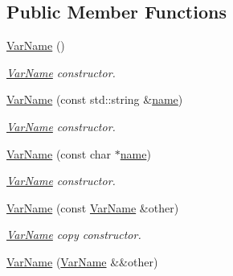 \subsection*{Public Member Functions}
\begin{DoxyCompactItemize}
\item 
\hyperlink{classcreek_1_1_var_name_a7f1b641288c66a55d78f77a0548edffe}{Var\+Name} ()\hypertarget{classcreek_1_1_var_name_a7f1b641288c66a55d78f77a0548edffe}{}\label{classcreek_1_1_var_name_a7f1b641288c66a55d78f77a0548edffe}

\begin{DoxyCompactList}\small\item\em {\ttfamily \hyperlink{classcreek_1_1_var_name}{Var\+Name}} constructor. \end{DoxyCompactList}\item 
\hyperlink{classcreek_1_1_var_name_ac462c46e6ca3a7a75395608bd7b120ad}{Var\+Name} (const std\+::string \&\hyperlink{classcreek_1_1_var_name_af508e16490f2cfbfdcb561f9c855fcf0}{name})
\begin{DoxyCompactList}\small\item\em {\ttfamily \hyperlink{classcreek_1_1_var_name}{Var\+Name}} constructor. \end{DoxyCompactList}\item 
\hyperlink{classcreek_1_1_var_name_a0bbb0e0c4420ef40fed4a637666db0ea}{Var\+Name} (const char $\ast$\hyperlink{classcreek_1_1_var_name_af508e16490f2cfbfdcb561f9c855fcf0}{name})
\begin{DoxyCompactList}\small\item\em {\ttfamily \hyperlink{classcreek_1_1_var_name}{Var\+Name}} constructor. \end{DoxyCompactList}\item 
\hyperlink{classcreek_1_1_var_name_a1f3691161bcf6e90a120b39c29c6c50c}{Var\+Name} (const \hyperlink{classcreek_1_1_var_name}{Var\+Name} \&other)\hypertarget{classcreek_1_1_var_name_a1f3691161bcf6e90a120b39c29c6c50c}{}\label{classcreek_1_1_var_name_a1f3691161bcf6e90a120b39c29c6c50c}

\begin{DoxyCompactList}\small\item\em {\ttfamily \hyperlink{classcreek_1_1_var_name}{Var\+Name}} copy constructor. \end{DoxyCompactList}\item 
\hyperlink{classcreek_1_1_var_name_a42dd27a3725e2049e37269ff848a1219}{Var\+Name} (\hyperlink{classcreek_1_1_var_name}{Var\+Name} \&\&other)\hypertarget{classcreek_1_1_var_name_a42dd27a3725e2049e37269ff848a1219}{}\label{classcreek_1_1_var_name_a42dd27a3725e2049e37269ff848a1219}


\end{DoxyCompactItemize}
